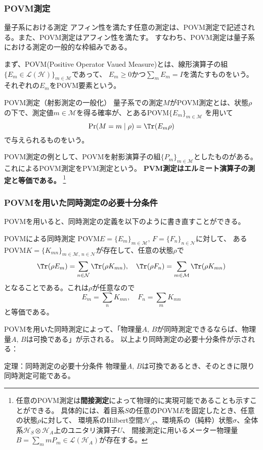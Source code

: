 \documentclass[10pt,aspectratio=169,xcolor=dvipsnames,table,dvipdfmx]{beamer}
\begin{document}
\begin{frame}
  \frametitle{POVM測定}
  \begin{alertblock}{量子系における測定}
    アフィン性を満たす任意の測定は、POVM測定で記述される。また、POVM測定はアフィン性を満たす。
    すなわち、POVM測定は量子系における測定の一般的な枠組みである。
  \end{alertblock}
  まず、POVM(Positive Operator Vaued Measure)とは、線形演算子の組$\{E_m\in \mathcal{L}(\mathcal{H})\}_{m\in \mathcal{M}}$であって、
  $E_m\geq 0$かつ$\sum_m E_m = I$を満たすものをいう。それぞれの$E_m$をPOVM要素という。
  
  \begin{block}{POVM測定（射影測定の一般化）}
    量子系での測定$M$がPOVM測定とは、状態$\rho$の下で、測定値$m\in \mathcal{M}$を得る確率が、とあるPOVM$\{E_m\}_{m\in\mathcal{M}}$
    を用いて
    \begin{equation}
      \Pr(M=m\mid \rho) = \Tr(E_m\rho)
    \end{equation}
    で与えられるものをいう。
  \end{block}
POVM測定の例として、POVMを射影演算子の組$\{P_m\}_{m\in \mathcal{M}}$としたものがある。これによるPOVM測定をPVM測定という。
\textbf{PVM測定はエルミート演算子の測定と等価である。}
\footnote{任意のPOVM測定は\textbf{間接測定}によって物理的に実現可能であることも示すことができる。
具体的には、着目系$S$の任意のPOVM$E$を固定したとき、任意の状態$\rho$に対して、
環境系のHilbert空間$\mathcal{H_A}$、環境系の（純粋）状態$\sigma$、全体系$\mathcal{H}_S\otimes \mathcal{H}_A$上のユニタリ演算子$U$、
間接測定に用いるメーター物理量$B=\sum_{m}mP_m\in \mathcal{L}(\mathcal{H}_A)$が存在する。}
\end{frame}

\begin{frame}
  \frametitle{POVMを用いた同時測定の必要十分条件}
  POVMを用いると、同時測定の定義を以下のように書き直すことができる。
  \begin{block}{POVMによる同時測定}
    POVM$E=\{E_m\}_{m\in\mathcal{M}},\,F=\{F_n\}_{n\in\mathcal{N}}$に対して、
    あるPOVM$K=\{K_{mn}\}_{m\in\mathcal{M},\,n\in\mathcal{N}}$が存在して、任意の状態$\rho$で
    \begin{equation}
      \Tr(\rho E_m) = \sum_{n\in\mathcal{N}}\Tr(\rho K_{mn}),\quad \Tr(\rho F_n) = \sum_{m\in\mathcal{M}}\Tr(\rho K_{mn})
    \end{equation}
    となることである。これは$\rho$が任意なので
    \begin{equation}
      E_m = \sum_{n}K_{mn},\quad F_n = \sum_{m}K_{mn}
    \end{equation}
    と等価である。
  \end{block}
  POVMを用いた同時測定によって、「物理量$A,\,B$が同時測定できるならば、物理量$A,\,B$は可換である」が示される。
  以上より同時測定の必要十分条件が示される：
  \begin{block}{定理：同時測定の必要十分条件}
    物理量$A,\,B$は可換であるとき、そのときに限り同時測定可能である。
  \end{block}
\end{frame}
\end{document}
